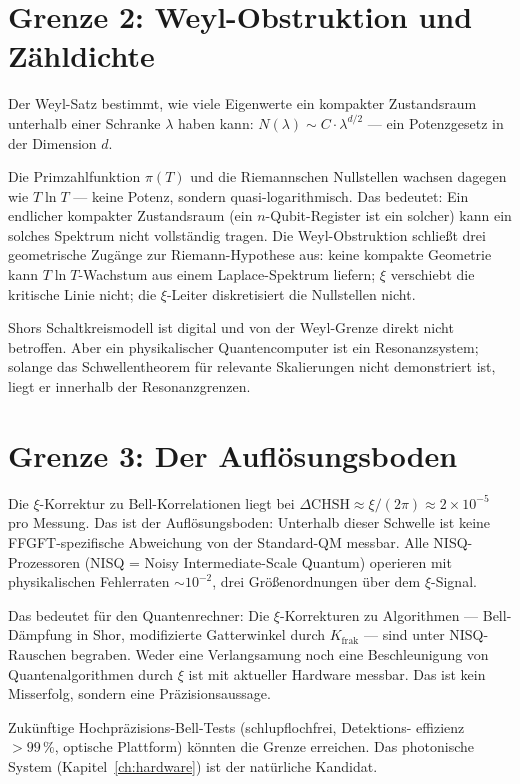 \section{Grenze 2: Weyl-Obstruktion und Zähldichte}

Der Weyl-Satz bestimmt, wie viele Eigenwerte ein kompakter Zustandsraum
unterhalb einer Schranke $\lambda$ haben kann:
$N(\lambda)\sim C\cdot\lambda^{d/2}$
--- ein Potenzgesetz in der Dimension $d$.

Die Primzahlfunktion $\pi(T)$ und die Riemannschen Nullstellen wachsen
dagegen wie $T\ln T$ --- keine Potenz, sondern quasi-logarithmisch. Das
bedeutet: Ein endlicher kompakter Zustandsraum (ein $n$-Qubit-Register
ist ein solcher) kann ein solches Spektrum nicht vollständig tragen.
Die Weyl-Obstruktion schließt drei geometrische Zugänge zur
Riemann-Hypothese aus: keine kompakte Geometrie kann
$T\ln T$-Wachstum aus einem Laplace-Spektrum liefern; $\xi$ verschiebt
die kritische Linie nicht; die $\xi$-Leiter diskretisiert die
Nullstellen nicht.

Shors Schaltkreismodell ist digital und von der Weyl-Grenze direkt nicht
betroffen. Aber ein physikalischer Quantencomputer ist ein Resonanzsystem;
solange das Schwellentheorem für relevante Skalierungen nicht demonstriert
ist, liegt er innerhalb der Resonanzgrenzen.

\section{Grenze 3: Der Auflösungsboden}

Die $\xi$-Korrektur zu Bell-Korrelationen liegt bei $\Delta\mathrm{CHSH}
\approx\xi/(2\pi)\approx2\times10^{-5}$ pro Messung. Das ist
der Auflösungsboden: Unterhalb dieser Schwelle ist keine FFGFT-spezifische
Abweichung von der Standard-QM messbar. Alle NISQ-Prozessoren (NISQ =
Noisy Intermediate-Scale Quantum) operieren mit physikalischen Fehlerraten
$\sim10^{-2}$, drei Größenordnungen über dem $\xi$-Signal.

Das bedeutet für den Quantenrechner: Die $\xi$-Korrekturen zu Algorithmen
--- Bell-Dämpfung in Shor, modifizierte Gatterwinkel durch $K_{\mathrm{frak}}$
--- sind unter NISQ-Rauschen begraben. Weder eine Verlangsamung
noch eine Beschleunigung von Quantenalgorithmen durch $\xi$ ist mit
aktueller Hardware messbar. Das ist kein Misserfolg, sondern eine
Präzisionsaussage.

Zukünftige Hochpräzisions-Bell-Tests (schlupflochfrei, Detektions-
effizienz $>99\,\%$, optische Plattform) könnten die Grenze erreichen.
Das photonische System (Kapitel~\ref{ch:hardware}) ist der natürliche
Kandidat.

